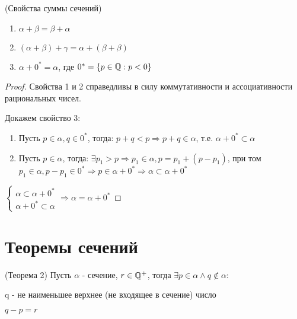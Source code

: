 \begin{theorem} (Свойства суммы сечений)
    \label{properties_of_sections}
    \begin{enumerate}
        \item $\alpha + \beta = \beta + \alpha$
        \item $(\alpha + \beta) + \gamma = \alpha + (\beta + \beta)$
        \item $\alpha + 0^* = \alpha$, где $0^* = \{p \in \mathbb{Q}: p < 0\}$
    \end{enumerate}
\end{theorem}

\begin{proof}
    Свойства 1 и 2 справедливы в силу коммутативности и ассоциативности рациональных чисел.
    
    Докажем свойство 3:
    \begin{enumerate}
        \item Пусть $p \in \alpha, q \in 0^* $, тогда: $ p + q < p \Rightarrow p + q \in \alpha$, т.е. $\alpha + 0^* \subset \alpha$
        \item Пусть $p \in \alpha$, тогда: $\exists p_1 > p \Rightarrow p_1 \in \alpha, p = p_1 + (p - p_1)$, при том $p_1 \in \alpha, p - p_1 \in 0^* \Rightarrow p \in \alpha + 0^* \Rightarrow \alpha \subset \alpha + 0^*$
    \end{enumerate}

    $\begin{cases}
        \alpha \subset \alpha + 0^* \\
        \alpha + 0^* \subset \alpha
    \end{cases} \Rightarrow \alpha = \alpha + 0^*$
\end{proof}

\section{Теоремы сечений}

\begin{theorem} (Теорема 2)
    \label{theorem_2_of_sections}
    Пусть $\alpha$ - сечение, $r \in \mathbb{Q}^+$, тогда $\exists p \in \alpha \land q \notin \alpha$:

    q - не наименьшее верхнее (не входящее в сечение) число

    $q - p = r$
\end{theorem}

